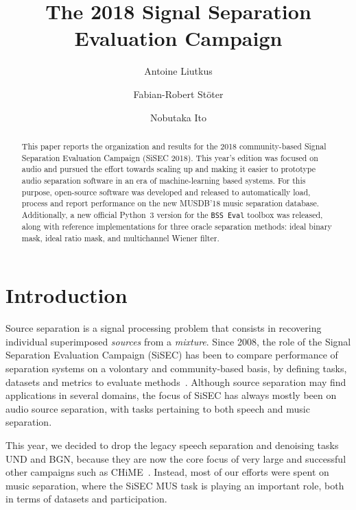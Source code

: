 \documentclass{llncs}
\begin{document}
\title{The 2018 Signal Separation Evaluation Campaign}
\author{
Antoine Liutkus \and
Fabian-Robert St\"{o}ter \and
Nobutaka Ito
}


\maketitle
%
\vspace{-3mm}
\begin{abstract}
This paper reports the organization and results for the 2018 community-based Signal Separation Evaluation Campaign (SiSEC 2018). This year's edition was focused on audio and pursued the effort towards scaling up and making it easier to prototype audio separation software in an era of machine-learning based systems. For this purpose, open-source software was developed and released to automatically load, process and report performance on the new MUSDB'18 music separation database. Additionally, a new official Python~3 version for the \texttt{BSS~Eval} toolbox was released, along with reference implementations for three oracle separation methods: ideal binary mask, ideal ratio mask, and multichannel Wiener filter.
\end{abstract}

\setcounter{footnote}{0}
\section{Introduction}
\vspace{-2mm}
Source separation is a signal processing problem that consists in recovering individual superimposed \textit{sources} from a \textit{mixture}.  Since 2008, the role of the Signal Separation Evaluation Campaign (SiSEC) has been to compare performance of separation systems on a volontary and community-based basis, by defining tasks, datasets and metrics to evaluate methods~\cite{sassec2007,sisec2008,sisec0710,sisec2011,sisec2013,sisec2015,sisec2016}. Although source separation may find applications in several domains, the focus of SiSEC has always mostly been on audio source separation, with tasks pertaining to both speech and music separation.

This year, we decided to drop the legacy speech separation and denoising tasks UND and BGN, because they are now the core focus of very large and successful other campaigns such as CHiME~\cite{chime,chime2,chime3}. Instead, most of our efforts were spent on music separation, where the SiSEC MUS task is playing an important role, both in terms of datasets and participation.
\end{document}
